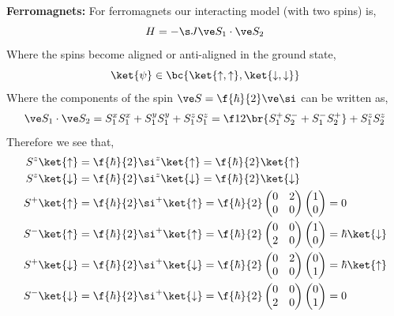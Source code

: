 \documentclass{article}
\newcommand{\uu}{\uparrow}
\newcommand{\dd}{\downarrow}
\begin{document}
\textbf{Ferromagnets:}
For ferromagnets our interacting model (with two spins) is,
\[ H = - \s J \ve S_1 \cdot \ve S_2 \]
Where the spins become aligned or anti-aligned in the ground state,
\[ \ket{\psi} \in \bc{\ket{\uu, \uu}, \ket{\dd, \dd}} \]
Where the components of the spin $\ve S = \f{\hbar}{2} \ve \si$ can be written as,
\[ \ve S_1 \cdot \ve S_2 = S_1^xS_1^x + S_1^yS_1^y + S_1^zS_1^z = \f12 \br{S_1^+ S_2^- + S_1^- S_2^+} + S_1^z S_2^z \]
Therefore we see that,
\begin{align*}
    S^z \ket{\uu} &= \f{\hbar}{2}\si^{z}\ket{\uu} = \f{\hbar}{2}\ket{\uu} \\
    S^z \ket{\dd} &= \f{\hbar}{2}\si^{z}\ket{\dd} = \f{\hbar}{2}\ket{\dd} \\
    S^+ \ket{\uu} &= \f{\hbar}{2}\si^{+}\ket{\uu} = \f{\hbar}{2} \begin{pmatrix}
        0 & 2 \\
        0 & 0 \\
    \end{pmatrix}\begin{pmatrix}
        1 \\ 0
    \end{pmatrix}  = 0 \\
    S^- \ket{\uu} &= \f{\hbar}{2}\si^{+}\ket{\uu} = \f{\hbar}{2} \begin{pmatrix}
        0 & 0 \\
        2 & 0 \\
    \end{pmatrix}\begin{pmatrix}
        1 \\ 0
    \end{pmatrix} = \hbar \ket{\dd} \\
    S^+ \ket{\dd} &= \f{\hbar}{2}\si^{+}\ket{\dd} = \f{\hbar}{2} \begin{pmatrix}
        0 & 2 \\
        0 & 0 \\
    \end{pmatrix}\begin{pmatrix}
        0 \\ 1
    \end{pmatrix}  = \hbar \ket{\uu} \\
    S^- \ket{\dd} &= \f{\hbar}{2}\si^{+}\ket{\dd} = \f{\hbar}{2} \begin{pmatrix}
        0 & 0 \\
        2 & 0 \\
    \end{pmatrix}\begin{pmatrix}
        0 \\ 1
    \end{pmatrix} = 0
\end{align*}
\end{document}
